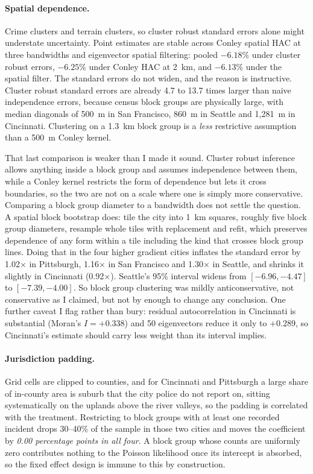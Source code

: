 \documentclass[11pt,letterpaper]{article}
\begin{document}
\paragraph{Spatial dependence.} Crime clusters and terrain clusters, so cluster robust
standard errors alone might understate uncertainty. Point estimates are stable across
Conley spatial HAC \cite{conley1999} at three bandwidths and eigenvector spatial
filtering: pooled
$-6.18\%$ under cluster robust errors, $-6.25\%$ under Conley HAC at 2~km, and
$-6.13\%$ under the spatial filter. The standard errors do not widen, and the reason
is instructive. Cluster robust standard errors are already 4.7 to 13.7 times larger
than naive independence errors, because census block groups are physically large, with
median diagonals of 500~m in San Francisco, 860~m in Seattle and 1,281~m in
Cincinnati. Clustering on a 1.3~km block group is a \emph{less} restrictive assumption
than a 500~m Conley kernel.

That last comparison is weaker than I made it sound. Cluster robust inference allows
anything inside a block group and assumes independence between them, while a Conley
kernel restricts the form of dependence but lets it cross boundaries, so the two are
not on a scale where one is simply more conservative. Comparing a block group diameter
to a bandwidth does not settle the question. A spatial block bootstrap does: tile the
city into 1~km squares, roughly five block group diameters, resample whole tiles with
replacement and refit, which preserves dependence of any form within a tile including
the kind that crosses block group lines. Doing that in the four higher gradient cities
inflates the standard error by 1.02$\times$ in Pittsburgh, 1.16$\times$ in San
Francisco and 1.30$\times$ in Seattle, and shrinks it slightly in Cincinnati
(0.92$\times$). Seattle's 95\% interval widens from $[-6.96, -4.47]$ to
$[-7.39, -4.00]$. So block group clustering was mildly anticonservative, not
conservative as I claimed, but not by enough to change any conclusion. One further
caveat I flag rather than bury:
residual autocorrelation in Cincinnati is substantial (Moran's $I = +0.338$) and 50
eigenvectors reduce it only to $+0.289$, so Cincinnati's estimate should carry less
weight than its interval implies.

\paragraph{Jurisdiction padding.} Grid cells are clipped to counties, and for
Cincinnati and Pittsburgh a large share of in-county area is suburb that the city
police do not report on, sitting systematically on the uplands above the river
valleys, so the padding is correlated with the treatment. Restricting to block groups
with at least one recorded incident drops 30--40\% of the sample in those two cities
and moves the coefficient by \emph{0.00 percentage points in all four}. A block group
whose counts are uniformly zero contributes nothing to the Poisson likelihood once its
intercept is absorbed, so the fixed effect design is immune to this by construction.
\end{document}

